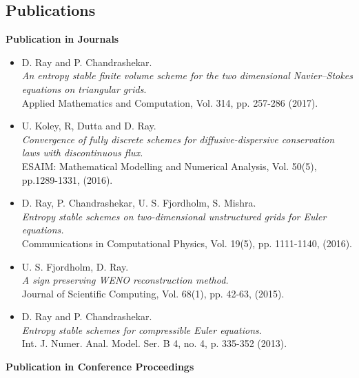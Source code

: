 \documentclass[margin]{res}
\begin{document}
\begin{resume}
 \section{Publications}

\textbf{Publication in Journals}                
            \begin{itemize}            
            \item D. Ray and P. Chandrashekar.\\
              {\it An entropy stable finite volume scheme for the two dimensional Navier–Stokes equations on triangular grids}.\\
              Applied Mathematics and Computation, Vol. 314, pp. 257-286 (2017).
             \item U. Koley, R, Dutta and D. Ray. \\
              {\it Convergence of fully discrete schemes for diffusive-dispersive conservation laws with discontinuous flux.}\\
              ESAIM: Mathematical Modelling and Numerical Analysis, Vol. 50(5), pp.1289-1331, (2016).
              
              \item D. Ray, P. Chandrashekar, U. S. Fjordholm, S. Mishra. \\
              {\it Entropy stable schemes on two-dimensional unstructured grids for Euler equations.}\\
              Communications in Computational Physics, Vol. 19(5), pp. 1111-1140, (2016).
            
              \item U. S. Fjordholm, D. Ray. \\
              {\it A sign preserving WENO reconstruction method.}\\
              Journal of Scientific Computing, Vol. 68(1), pp. 42-63, (2015).
             
              \item D. Ray and P. Chandrashekar.\\
              {\it Entropy stable schemes for compressible Euler equations}.\\
              Int. J. Numer. Anal. Model. Ser. B 4, no. 4, p. 335-352 (2013).
             \end{itemize}



\textbf{Publication in Conference Proceedings}                
            \begin{itemize}           
              

\end{itemize}
\end{resume}
\end{document}
